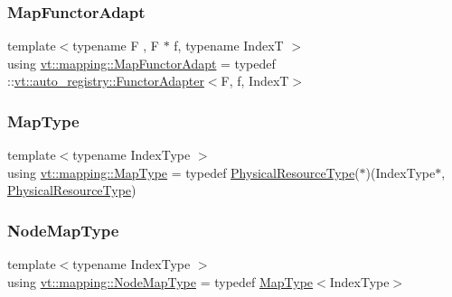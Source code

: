 \subsubsection{\texorpdfstring{Map\+Functor\+Adapt}{MapFunctorAdapt}}
{\footnotesize\ttfamily template$<$typename F , F $\ast$ f, typename IndexT $>$ \\
using \hyperlink{namespacevt_1_1mapping_add4b5257a62b56d194f7e931b608f8f0}{vt\+::mapping\+::\+Map\+Functor\+Adapt} = typedef \+::\hyperlink{structvt_1_1auto__registry_1_1_functor_adapter}{vt\+::auto\+\_\+registry\+::\+Functor\+Adapter}$<$F, f, IndexT$>$}

\mbox{\label{namespacevt_1_1mapping_a443f8bb8920af5ae1d3391f61fe492a6}} 
\subsubsection{\texorpdfstring{Map\+Type}{MapType}}
{\footnotesize\ttfamily template$<$typename Index\+Type $>$ \\
using \hyperlink{namespacevt_1_1mapping_a443f8bb8920af5ae1d3391f61fe492a6}{vt\+::mapping\+::\+Map\+Type} = typedef \hyperlink{namespacevt_a2dc36fcada816dc6d11774d650328ee9}{Physical\+Resource\+Type}($\ast$)(Index\+Type$\ast$, \hyperlink{namespacevt_a2dc36fcada816dc6d11774d650328ee9}{Physical\+Resource\+Type})}

\mbox{\label{namespacevt_1_1mapping_a8dbe779cb3e28ed8c424bcc8826765b9}} 
\subsubsection{\texorpdfstring{Node\+Map\+Type}{NodeMapType}}
{\footnotesize\ttfamily template$<$typename Index\+Type $>$ \\
using \hyperlink{namespacevt_1_1mapping_a8dbe779cb3e28ed8c424bcc8826765b9}{vt\+::mapping\+::\+Node\+Map\+Type} = typedef \hyperlink{namespacevt_1_1mapping_a443f8bb8920af5ae1d3391f61fe492a6}{Map\+Type}$<$Index\+Type$>$}

\mbox{\label{namespacevt_1_1mapping_a84d654b657f2dbe639ada06ae688e4c7}} 
